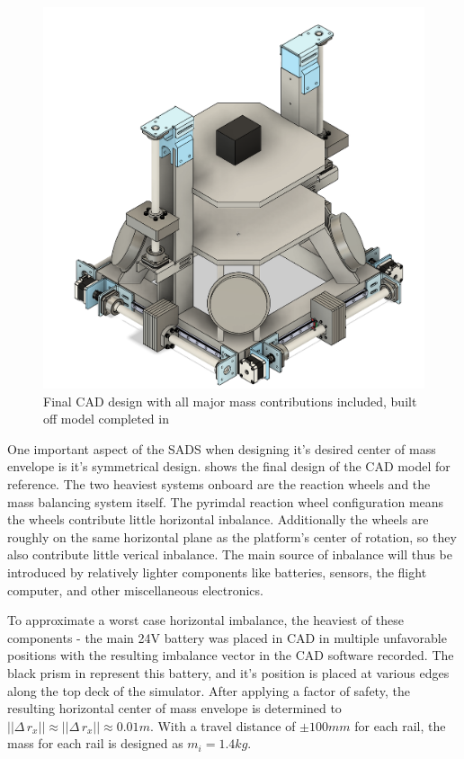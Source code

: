 \begin{figure}[h]\label{fig:full_CAD}
    \centering
    \includegraphics[width=0.95\linewidth]{figures/full_CAD.png}
    \caption{Final CAD design with all major mass contributions included, built off model completed in~\cite{gilman_automatic_2024}}
    \label{fig:final_CAD}
\end{figure}


One important aspect of the SADS when designing it's desired center of mass envelope is it's symmetrical design.  shows the final design of the CAD model for reference. The two heaviest systems onboard are the reaction wheels and the mass balancing system itself. The pyrimdal reaction wheel configuration means the wheels contribute little horizontal inbalance. Additionally the wheels are roughly on the same horizontal plane as the platform's center of rotation, so they also contribute little verical inbalance. The main source of inbalance will thus be introduced by relatively lighter components like batteries, sensors, the flight computer, and other miscellaneous electronics.

To approximate a worst case horizontal imbalance, the heaviest of these components - the main 24V battery was placed in CAD in multiple unfavorable positions with the resulting imbalance vector in the CAD software recorded. The black prism in  represent this battery, and it's position is placed at various edges along the top deck of the simulator. After applying a factor of safety, the resulting horizontal center of mass envelope is determined to $||\Delta\,r_x|| \approx ||\Delta\,r_x|| \approx 0.01m$. With a travel distance of $\pm100mm$ for each rail, the mass for each rail is designed as $m_i = 1.4kg$.


